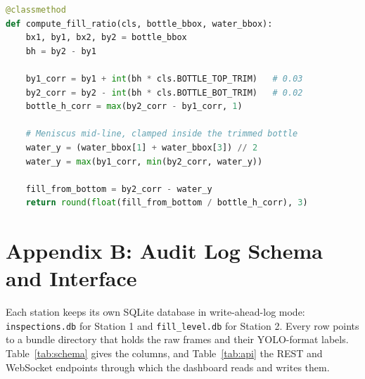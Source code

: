 \begin{lstlisting}[language=Python, caption={Fill-ratio computation}, label={lst:fill}]
@classmethod
def compute_fill_ratio(cls, bottle_bbox, water_bbox):
    bx1, by1, bx2, by2 = bottle_bbox
    bh = by2 - by1

    by1_corr = by1 + int(bh * cls.BOTTLE_TOP_TRIM)   # 0.03
    by2_corr = by2 - int(bh * cls.BOTTLE_BOT_TRIM)   # 0.02
    bottle_h_corr = max(by2_corr - by1_corr, 1)

    # Meniscus mid-line, clamped inside the trimmed bottle
    water_y = (water_bbox[1] + water_bbox[3]) // 2
    water_y = max(by1_corr, min(by2_corr, water_y))

    fill_from_bottom = by2_corr - water_y
    return round(float(fill_from_bottom / bottle_h_corr), 3)
\end{lstlisting}

\chapter{Appendix B: Audit Log Schema and Interface}
\label{appendix:api}

Each station keeps its own SQLite database in write-ahead-log mode: \texttt{inspections.db} for Station 1 and \texttt{fill\_level.db} for Station 2. Every row points to a bundle directory that holds the raw frames and their YOLO-format labels. Table~\ref{tab:schema} gives the columns, and Table~\ref{tab:api} the REST and WebSocket endpoints through which the dashboard reads and writes them.

